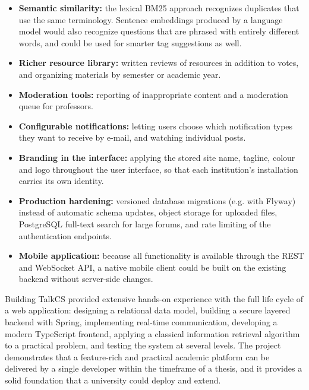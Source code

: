 \begin{itemize}
  \item \textbf{Semantic similarity:} the lexical BM25 approach recognizes duplicates that
    use the same terminology. Sentence embeddings produced by a language model would also
    recognize questions that are phrased with entirely different words, and could be
    used for smarter tag suggestions as well.
  \item \textbf{Richer resource library:} written reviews of resources in addition to
    votes, and organizing materials by semester or academic year.
  \item \textbf{Moderation tools:} reporting of inappropriate content and a moderation
    queue for professors.
  \item \textbf{Configurable notifications:} letting users choose which notification types
    they want to receive by e-mail, and watching individual posts.
  \item \textbf{Branding in the interface:} applying the stored site name, tagline, colour
    and logo throughout the user interface, so that each institution's installation
    carries its own identity.
  \item \textbf{Production hardening:} versioned database migrations (e.g. with Flyway)
    instead of automatic schema updates, object storage for uploaded files, PostgreSQL
    full-text search for large forums, and rate limiting of the
    authentication endpoints.
  \item \textbf{Mobile application:} because all functionality is available through the
    REST and WebSocket API, a native mobile client could be built on the existing backend
    without server-side changes.
\end{itemize}

Building TalkCS provided extensive hands-on experience with the full life cycle of a web
application: designing a relational data model, building a secure layered backend with
Spring, implementing real-time communication, developing a modern TypeScript frontend,
applying a classical information retrieval algorithm to a practical problem, and testing
the system at several levels. The project demonstrates that a feature-rich and practical
academic platform can be delivered by a single developer within the timeframe of a
thesis, and it provides a solid foundation that a university could deploy and extend.
